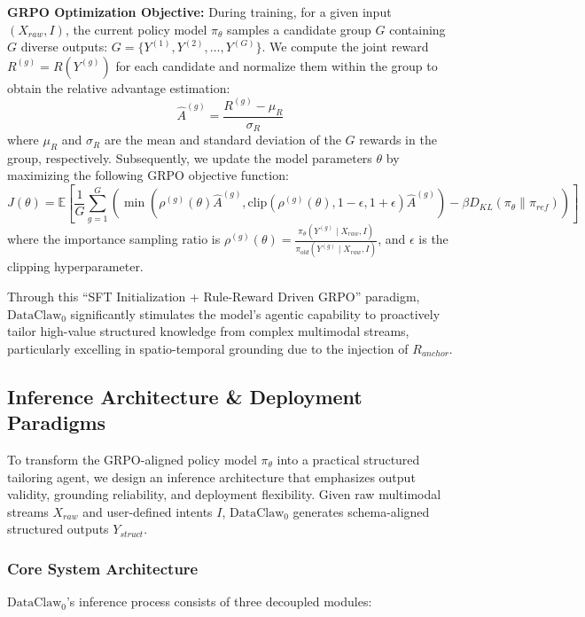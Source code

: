 \documentclass{llmxive}
\begin{document}
\textbf{GRPO Optimization Objective:}
During training, for a given input \((X_{raw}, I)\), the current policy model \(\pi_\theta\) samples a candidate group \(G\) containing \(G\) diverse outputs: \(G = \{Y^{(1)}, Y^{(2)}, \dots, Y^{(G)}\}\).
We compute the joint reward \(R^{(g)} = R(Y^{(g)})\) for each candidate and normalize them within the group to obtain the relative advantage estimation:
\begin{equation}
\hat{A}^{(g)} = \frac{R^{(g)} - \mu_R}{\sigma_R}
\end{equation}
where \(\mu_R\) and \(\sigma_R\) are the mean and standard deviation of the \(G\) rewards in the group, respectively. Subsequently, we update the model parameters \(\theta\) by maximizing the following GRPO objective function:
\begin{equation}
J(\theta) = \mathbb{E}\left[\frac{1}{G}\sum\limits_{g=1}^G \left(\min\left(\rho^{(g)}(\theta)\hat{A}^{(g)}, \text{clip}(\rho^{(g)}(\theta), 1-\epsilon, 1+\epsilon)\hat{A}^{(g)}\right) - \beta D_{KL}(\pi_\theta \parallel \pi_{ref})\right)\right]
\end{equation}
where the importance sampling ratio is \(\rho^{(g)}(\theta) = \frac{\pi_\theta(Y^{(g)}\mid X_{raw},I)}{\pi_{old}(Y^{(g)}\mid X_{raw},I)}\), and \(\epsilon\) is the clipping hyperparameter. 

Through this ``SFT Initialization + Rule-Reward Driven GRPO'' paradigm, $\text{DataClaw}_0$ significantly stimulates the model's agentic capability to proactively tailor high-value structured knowledge from complex multimodal streams, particularly excelling in spatio-temporal grounding due to the injection of \(R_{anchor}\).

\subsection{Inference Architecture \& Deployment Paradigms}
\label{app:deployment}

To transform the GRPO-aligned policy model \(\pi_\theta\) into a practical structured tailoring agent, we design an inference architecture that emphasizes output validity, grounding reliability, and deployment flexibility. Given raw multimodal streams \(X_{raw}\) and user-defined intents \(I\), $\text{DataClaw}_0$ generates schema-aligned structured outputs \(Y_{struct}\).

\subsubsection{Core System Architecture}
\label{app:inf}
$\text{DataClaw}_0$'s inference process consists of three decoupled modules:
    
\end{document}
